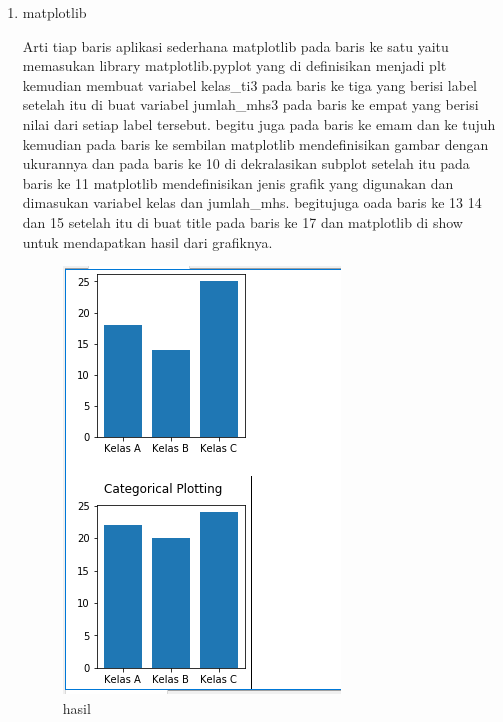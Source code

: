 \begin{enumerate}
\item matplotlib\par
Arti tiap baris aplikasi sederhana matplotlib pada baris ke satu yaitu memasukan library matplotlib.pyplot yang di definisikan menjadi plt kemudian membuat variabel kelas\_ti3 pada baris ke tiga yang berisi label setelah itu di buat variabel jumlah\_mhs3 pada baris ke empat yang berisi nilai dari setiap label tersebut. begitu juga pada baris ke emam dan ke tujuh kemudian pada baris ke sembilan matplotlib mendefinisikan gambar dengan ukurannya dan pada baris ke 10 di dekralasikan subplot setelah itu pada baris ke 11 matplotlib mendefinisikan jenis grafik yang digunakan dan dimasukan variabel kelas dan jumlah\_mhs. begitujuga oada baris ke 13 14 dan 15 setelah itu di buat title  pada baris ke 17 dan matplotlib di show untuk mendapatkan hasil dari grafiknya.

\begin{figure}[ht]
\centering
\includegraphics[scale=0.5]{figures/1174051/3/6.PNG}
\caption{hasil}
\label{contoh}
\end{figure}


\end{enumerate}
